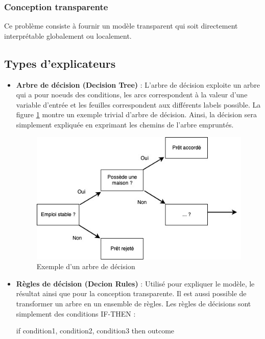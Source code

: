 \subsubsection{Conception transparente}
Ce problème consiste à fournir un modèle transparent qui soit directement interprétable globalement ou localement.

\subsection{Types d'explicateurs}
\begin{itemize}
    \item \textbf{Arbre de décision (Decision Tree)} : L'arbre de décision exploite un arbre qui a pour noeuds des conditions, les arcs correspondent à la valeur d'une variable d'entrée et les feuilles correspondent aux différents labels possible. La figure \ref{decision_tree} montre un exemple trivial d'arbre de décision. Ainsi, la décision sera simplement expliquée en exprimant les chemins de l'arbre empruntés. 

    \begin{figure}[h]
    \centering
    \includegraphics[scale=0.5]{src_img/decision_tree.jpg}
    \caption{Exemple d'un arbre de décision}
    \label{decision_tree}
    \end{figure}
    
    \item \textbf{Règles de décision (Decion Rules)} : Utilisé pour expliquer le modèle, le résultat ainsi que pour la conception transparente. Il est aussi possible de transformer un arbre en un ensemble de règles. Les règles de décisions sont simplement des conditions IF-THEN : 
    
    if condition1, condition2, condition3 then outcome 
    

\end{itemize}
